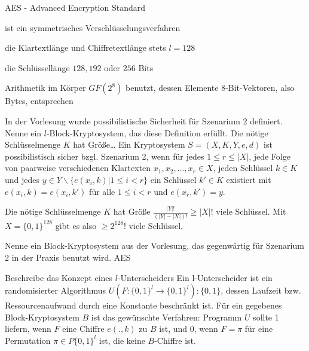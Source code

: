 \documentclass[avery5371, frame]{flashcards}
\begin{document}
\begin{flashcard}[Definition]{AES - Advanced Encryption Standard}
    \begin{itemize*}
        \item ist ein symmetrisches Verschlüsselungsverfahren
        \item die Klartextlänge und Chiffretextlänge stets $l= 128$
        \item die Schlüssellänge $128,192$ oder $256$ Bits
        \item Arithmetik im Körper $GF(2^8)$ benutzt, dessen Elemente $8$-Bit-Vektoren, also Bytes, entsprechen
    \end{itemize*}
\end{flashcard}

\begin{flashcard}{In der Vorlesung wurde possibilistische Sicherheit für Szenarium 2 definiert. Nenne ein $l$-Block-Kryptosystem, das diese Definition erfüllt. Die nötige Schlüsselmenge $K$ hat Größe\dots}
    Ein Kryptosystem $S=(X,K,Y,e,d)$ ist possibilistisch sicher bzgl. Szenarium 2, wenn für jedes $1 \leq r\leq |X|$, jede Folge von paarweise verschiedenen Klartexten $x_1,x_2,\dots,x_r\in X$, jeden Schlüssel $k\in K$ und jedes $y\in Y\backslash\{e(x_i,k)| 1 \leq i < r\}$ ein Schlüssel $k'\in K$ existiert mit $e(x_i,k)=e(x_i,k')$ für alle $1\leq i< r$ und $e(x_r,k')=y$.

    Die nötige Schlüsselmenge $K$ hat Größe $\frac{|Y|!}{(|Y|-|X|)!} \geq |X|!$ viele Schlüssel.
    Mit $X=\{0,1\}^{128}$  gibt es also $\geq 2^{128}!$ viele Schlüssel.
\end{flashcard}

\begin{flashcard}{Nenne ein Block-Kryptosystem aus der Vorlesung, das gegenwärtig für Szenarium 2 in der Praxis benutzt wird.}
    AES
\end{flashcard}

\begin{flashcard}{Beschreibe das Konzept eines $l$-Unterscheiders}
    Ein l-Unterscheider ist ein randomisierter Algorithmus $U(F:\{0,1\}^l\rightarrow\{0,1\}^l):\{0,1\}$, dessen Laufzeit bzw. Ressourcenaufwand durch eine Konstante beschränkt ist.
    Für ein gegebenes Block-Kryptosystem $B$ ist das gewünschte Verfahren: Programm $U$ sollte 1 liefern, wenn $F$ eine Chiffre $e(.,k)$ zu $B$ ist, und $0$, wenn $F=\pi$ für eine Permutation $\pi\in P\{0,1\}^l$ ist, die keine $B$-Chiffre ist.
\end{flashcard}
\end{document}
